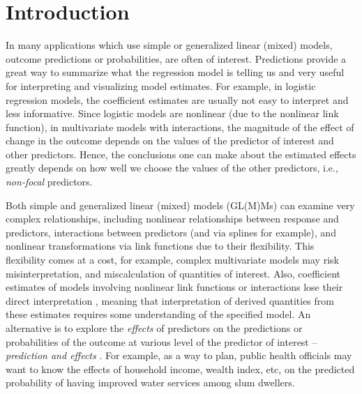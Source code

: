 \linenumbers

\section*{Introduction}

In many applications which use simple or generalized linear (mixed) models, outcome predictions or probabilities, are often of interest. Predictions provide a great way to summarize what the regression model is telling us and very useful for interpreting and visualizing model estimates. For example, in logistic regression models, the coefficient estimates are usually not easy to interpret and less informative. Since logistic models are nonlinear (due to the nonlinear link function), in multivariate models with interactions, the magnitude of the effect of change in the outcome depends on the values of the predictor of interest and other predictors. Hence, the conclusions one can make about the estimated effects greatly depends on how well we choose the values of the other predictors, i.e., \emph{non-focal} predictors.  

Both simple and generalized linear (mixed) models (GL(M)Ms) can examine very complex relationships, including nonlinear relationships between response and predictors, interactions between predictors (and via splines for example), and nonlinear transformations via link functions due to their flexibility. This flexibility comes at a cost, for example, complex multivariate models may risk misinterpretation, and miscalculation of quantities of interest. Also, coefficient estimates of models involving nonlinear link functions or interactions lose their direct interpretation \citep{leeper2017interpreting}, meaning that interpretation of derived quantities from these estimates requires some understanding of the specified model. An alternative is to explore the \emph{effects} of predictors on the predictions or probabilities of the outcome at various level of the predictor of interest -- \emph{prediction and effects} \citep{fox2009effect, leeper2017package, lenth2018package}. For example, as a way to plan, public health officials may want to know the effects of household income, wealth index, etc, on the predicted probability of having improved water services among slum dwellers.


